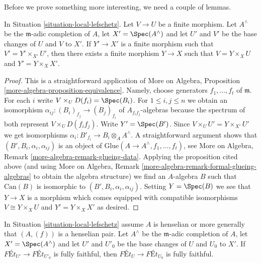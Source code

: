 \noindent
Before we prove something more interesting, we need a couple of lemmas.

\begin{lemma}
\label{lemma-fill-in-missing}
In Situation \ref{situation-local-lefschetz}. Let $V \to U$ be a finite
morphism.  Let $A^\wedge$ be the $\mathfrak m$-adic completion of $A$,
let $X' = \Spec(A^\wedge)$ and let $U'$ and $V'$ be the base changes of
$U$ and $V$ to $X'$. If $Y' \to X'$ is a finite morphism such that
$V' = Y' \times_{X'} U'$, then there exists a finite morphism $Y \to X$
such that $V = Y \times_X U$ and $Y' = Y \times_X X'$.
\end{lemma}

\begin{proof}
This is a straightforward application of
More on Algebra, Proposition \ref{more-algebra-proposition-equivalence}.
Namely, choose generators $f_1, \ldots, f_t$ of $\mathfrak m$.
For each $i$ write $V \times_U D(f_i) = \Spec(B_i)$.
For $1 \leq i, j \leq n$ we obtain an isomorphism
$\alpha_{ij} : (B_i)_{f_j} \to (B_j)_{f_i}$ of $A_{f_if_j}$-algebras
because the spectrum of both represent $V \times_U D(f_if_j)$.
Write $Y' = \Spec(B')$. Since $V \times_U U' = Y \times_{X'} U'$
we get isomorphisms $\alpha_i : B'_{f_i} \to B_i \otimes_A A^\wedge$.
A straightforward argument shows that $(B', B_i, \alpha_i, \alpha_{ij})$
is an object of $\text{Glue}(A \to A^\wedge, f_1, \ldots, f_t)$, see
More on Algebra, Remark \ref{more-algebra-remark-glueing-data}.
Applying the proposition cited above (and using
More on Algebra, Remark \ref{more-algebra-remark-formal-glueing-algebras}
to obtain the algebra structure) we find an $A$-algebra $B$ such that
$\text{Can}(B)$ is isomorphic to $(B', B_i, \alpha_i, \alpha_{ij})$.
Setting $Y = \Spec(B)$ we see that $Y \to X$ is a morphism
which comes equipped with compatible isomorphisms
$V \cong Y \times_X U$ and $Y' = Y \times_X X'$ as desired.
\end{proof}

\begin{lemma}
\label{lemma-fully-faithful-henselian-completion}
In Situation \ref{situation-local-lefschetz} assume $A$ is henselian
or more generally that $(A, (f))$ is a henselian pair.
Let $A^\wedge$ be the $\mathfrak m$-adic completion of $A$,
let $X' = \Spec(A^\wedge)$ and let $U'$ and $U'_0$ be the base changes of
$U$ and $U_0$ to $X'$. If $\textit{F\'Et}_{U'} \to \textit{F\'Et}_{U'_0}$
is fully faithful, then $\textit{F\'Et}_U \to \textit{F\'Et}_{U_0}$
is fully faithful.
\end{lemma}


